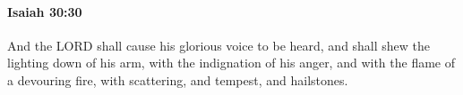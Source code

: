 
		\paragraph{Isaiah 30:30} %
			\label{ISAIAH-30-30}

			And the LORD shall cause his glorious voice to be heard, and shall shew the lighting down of his arm, with the indignation of his anger, and with the flame of a devouring fire, with scattering, and tempest, and hailstones.


